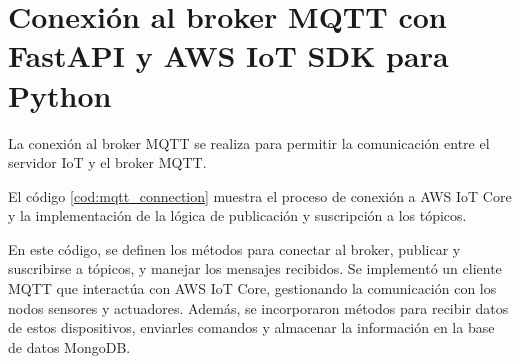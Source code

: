 \chapter{Conexión al broker MQTT con FastAPI y AWS IoT SDK para Python}
\label{AppendixC}

La conexión al broker MQTT se realiza para permitir la comunicación entre el
servidor IoT y el broker MQTT.

El código \ref{cod:mqtt_connection} muestra el proceso de conexión a AWS IoT
Core y la implementación de la lógica de publicación y suscripción a los
tópicos.

En este código, se definen los métodos para conectar al broker, publicar y
suscribirse a tópicos, y manejar los mensajes recibidos. Se implementó un
cliente MQTT que interactúa con AWS IoT Core, gestionando la comunicación con
los nodos sensores y actuadores. Además, se incorporaron métodos para recibir
datos de estos dispositivos, enviarles comandos y almacenar la información en
la base de datos MongoDB.

